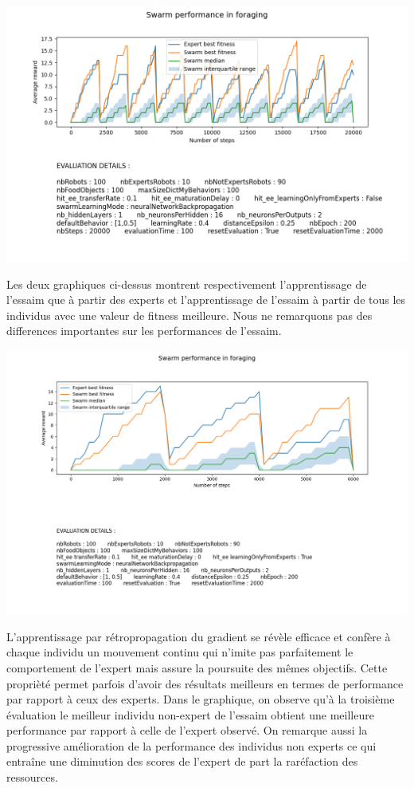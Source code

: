 \documentclass[a4paper, 12pt]{report}
\begin{document}
    \includegraphics[scale=0.5]{images/data_learnFromAll_20000_100_bp.png}
    
    Les deux graphiques ci-dessus montrent respectivement l'apprentissage de l'essaim que à partir des experts et l'apprentissage de l'essaim à partir de tous les individus avec une valeur de fitness meilleure.
    Nous ne remarquons pas des differences importantes sur les performances de l'essaim.

    
    \includegraphics[scale=0.5]{bp6000_100.png}
    
    L'apprentissage par rétropropagation du gradient se révèle efficace et confère à chaque individu un mouvement continu qui n'imite pas parfaitement le comportement de l'expert mais assure la poursuite des mêmes objectifs. Cette proprièté permet parfois d'avoir des résultats meilleurs en termes de performance par rapport à ceux des experts. 
    Dans le graphique, on observe qu'à la troisième évaluation le meilleur individu non-expert de l'essaim obtient une meilleure performance par rapport à celle de l'expert observé. On remarque aussi la progressive amélioration de la performance des individus non experts ce qui entraîne une diminution des scores de l'expert de part la raréfaction des ressources.
\end{document}
